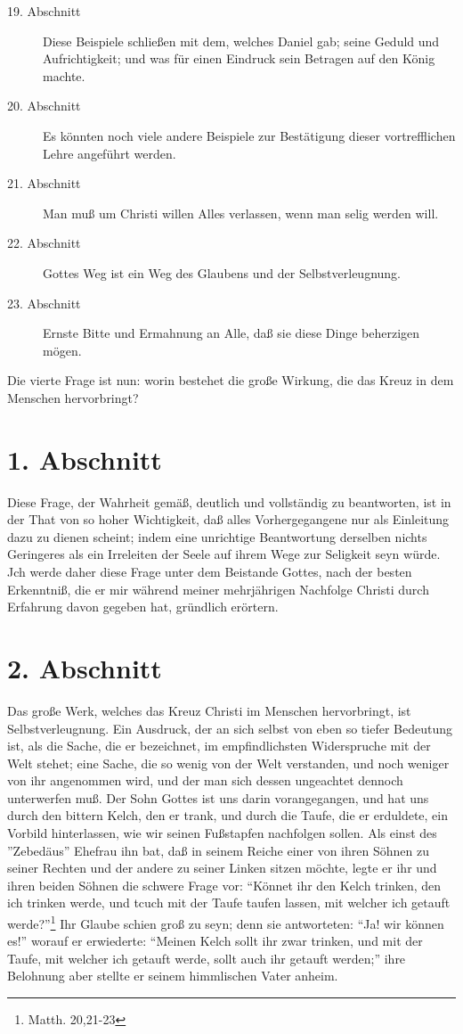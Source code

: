\begin{description}
\item[19. Abschnitt] Diese Beispiele schließen mit dem, welches Daniel gab; seine Geduld und Aufrichtigkeit; und was für einen Eindruck sein Betragen auf den König machte.
\item[20. Abschnitt] Es könnten noch viele andere Beispiele zur Bestätigung dieser vortrefflichen Lehre angeführt werden.
\item[21. Abschnitt] Man muß um Christi willen Alles verlassen, wenn man selig werden will.
\item[22. Abschnitt] Gottes Weg ist ein Weg des Glaubens und der Selbstverleugnung.
\item[23. Abschnitt] Ernste Bitte und Ermahnung an Alle, daß sie diese Dinge beherzigen mögen.
\end{description}
\normalsize


Die vierte Frage ist nun: worin bestehet die große Wirkung, die das Kreuz in dem Menschen hervorbringt?

\section{1. Abschnitt}

Diese Frage, der Wahrheit gemäß, deutlich und vollständig zu beantworten, ist in der That von so hoher Wichtigkeit, daß alles Vorhergegangene nur als Einleitung dazu zu dienen scheint; indem eine unrichtige Beantwortung derselben nichts Geringeres als ein Irreleiten der Seele auf ihrem Wege zur Seligkeit seyn würde. Jch werde daher diese Frage unter dem Beistande Gottes, nach der besten Erkenntniß, die er mir während meiner mehrjährigen Nachfolge Christi durch Erfahrung davon gegeben hat, gründlich erörtern.

\section{2. Abschnitt}

Das große Werk, welches das Kreuz Christi im Menschen hervorbringt, ist Selbstverleugnung. Ein Ausdruck, der an sich selbst von eben so tiefer Bedeutung ist, als die Sache, die er bezeichnet, im empfindlichsten Widerspruche mit der Welt stehet; eine Sache, die so wenig von der Welt verstanden, und noch weniger von ihr angenommen wird, und der man sich dessen ungeachtet dennoch unterwerfen muß. Der Sohn Gottes ist uns darin vorangegangen, und hat uns durch den bittern Kelch, den er trank, und durch die Taufe, die er erduldete, ein Vorbild hinterlassen, wie wir seinen Fußstapfen nachfolgen sollen. Als einst des ''Zebedäus'' Ehefrau ihn bat, daß in seinem Reiche einer von ihren Söhnen zu seiner Rechten und der andere zu seiner Linken sitzen möchte, legte er ihr und ihren beiden Söhnen die schwere Frage vor: "`Könnet ihr den Kelch trinken, den ich trinken werde, und tcuch mit der Taufe taufen lassen, mit welcher ich getauft werde?"'\footnote{Matth. 20,21-23} Ihr Glaube schien groß zu seyn; denn sie antworteten: "`Ja! wir können es!"' worauf er erwiederte: "`Meinen Kelch sollt ihr zwar trinken, und mit der Taufe, mit welcher ich getauft werde, sollt auch ihr getauft werden;"' ihre Belohnung aber stellte er seinem himmlischen Vater anheim.


